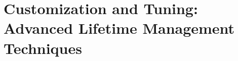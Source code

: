 \chapter{Customization and Tuning: Advanced Lifetime Management Techniques}
\label{chapter:advanced-lifetime-techniques}
